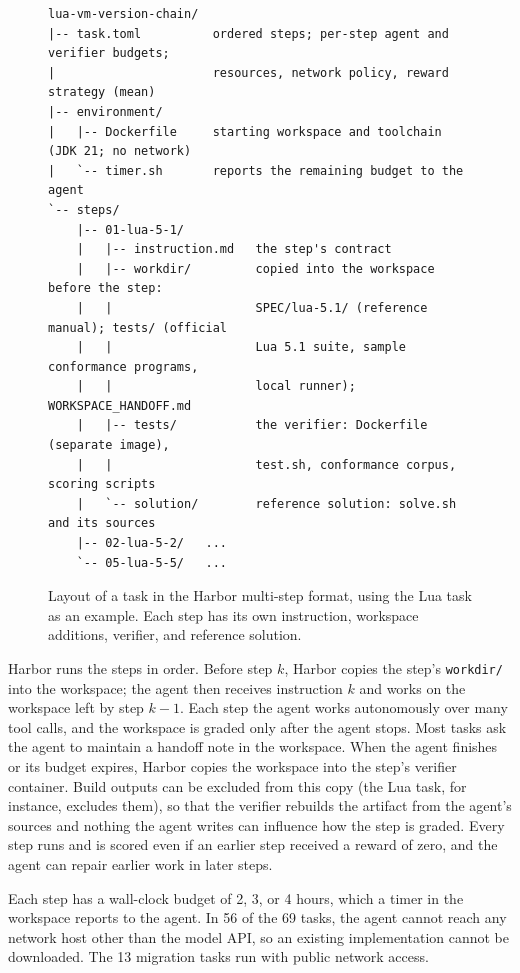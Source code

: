 \documentclass{article}
\begin{document}
\begin{figure}[H]
  \centering
  \begin{minipage}{0.95\linewidth}
  \footnotesize
\begin{verbatim}
lua-vm-version-chain/
|-- task.toml          ordered steps; per-step agent and verifier budgets;
|                      resources, network policy, reward strategy (mean)
|-- environment/
|   |-- Dockerfile     starting workspace and toolchain (JDK 21; no network)
|   `-- timer.sh       reports the remaining budget to the agent
`-- steps/
    |-- 01-lua-5-1/
    |   |-- instruction.md   the step's contract
    |   |-- workdir/         copied into the workspace before the step:
    |   |                    SPEC/lua-5.1/ (reference manual); tests/ (official
    |   |                    Lua 5.1 suite, sample conformance programs,
    |   |                    local runner); WORKSPACE_HANDOFF.md
    |   |-- tests/           the verifier: Dockerfile (separate image),
    |   |                    test.sh, conformance corpus, scoring scripts
    |   `-- solution/        reference solution: solve.sh and its sources
    |-- 02-lua-5-2/   ...
    `-- 05-lua-5-5/   ...
\end{verbatim}
  \end{minipage}
  \caption{Layout of a task in the Harbor multi-step format, using the Lua task
    as an example. Each step has its own instruction, workspace additions,
    verifier, and reference solution.}
  \label{fig:layout}
\end{figure}

Harbor runs the steps in order. Before step $k$, Harbor
copies the step's \texttt{workdir/} into the workspace; the agent then
receives instruction $k$ and works on the workspace left by step $k-1$. Each
step the agent works autonomously
over many tool calls, and the workspace is graded only after the agent stops.
Most tasks ask the agent to maintain a handoff note in the workspace. When the
agent finishes or its budget expires, Harbor copies the workspace into the
step's verifier container. Build outputs can be excluded from this copy (the
Lua task, for instance, excludes them), so that the verifier rebuilds the
artifact from the agent's sources and nothing the agent writes can influence
how the step is graded. Every step runs and is scored even if an earlier step
received a reward of zero, and the agent can repair earlier work in later
steps.

Each step has a wall-clock budget of 2, 3, or 4 hours, which a timer in the
workspace reports to the agent. In 56 of the 69 tasks, the agent cannot reach
any network host other than the model API, so an existing implementation cannot
be downloaded. The 13 migration tasks run with public network access.
\end{document}
